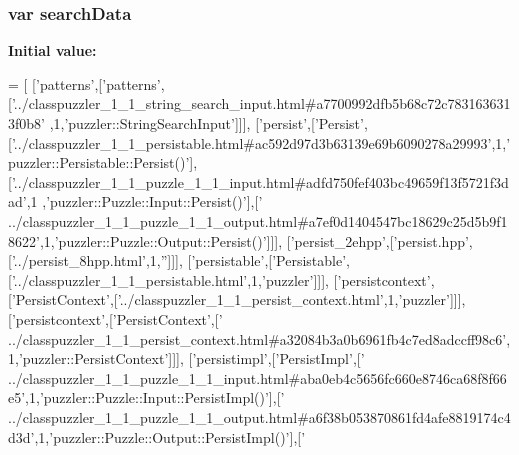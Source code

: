 \subsubsection[{search\+Data}]{\setlength{\rightskip}{0pt plus 5cm}var search\+Data}\label{a00058_ad01a7523f103d6242ef9b0451861231e}
{\bfseries Initial value\+:}
\begin{DoxyCode}
=
[
  [\textcolor{stringliteral}{'patterns'},[\textcolor{stringliteral}{'patterns'},[\textcolor{stringliteral}{'../classpuzzler\_1\_1\_string\_search\_input.html#a7700992dfb5b68c72c7831636313f0b8'}
      ,1,\textcolor{stringliteral}{'puzzler::StringSearchInput'}]]],
  [\textcolor{stringliteral}{'persist'},[\textcolor{stringliteral}{'Persist'},[\textcolor{stringliteral}{'../classpuzzler\_1\_1\_persistable.html#ac592d97d3b63139e69b6090278a29993'},1,\textcolor{stringliteral}{'
      puzzler::Persistable::Persist()'}],[\textcolor{stringliteral}{'../classpuzzler\_1\_1\_puzzle\_1\_1\_input.html#adfd750fef403bc49659f13f5721f3dad'},1
      ,\textcolor{stringliteral}{'puzzler::Puzzle::Input::Persist()'}],[\textcolor{stringliteral}{'
      ../classpuzzler\_1\_1\_puzzle\_1\_1\_output.html#a7ef0d1404547bc18629c25d5b9f18622'},1,\textcolor{stringliteral}{'puzzler::Puzzle::Output::Persist()'}]]],
  [\textcolor{stringliteral}{'persist\_2ehpp'},[\textcolor{stringliteral}{'persist.hpp'},[\textcolor{stringliteral}{'../persist\_8hpp.html'},1,\textcolor{stringliteral}{''}]]],
  [\textcolor{stringliteral}{'persistable'},[\textcolor{stringliteral}{'Persistable'},[\textcolor{stringliteral}{'../classpuzzler\_1\_1\_persistable.html'},1,\textcolor{stringliteral}{'puzzler'}]]],
  [\textcolor{stringliteral}{'persistcontext'},[\textcolor{stringliteral}{'PersistContext'},[\textcolor{stringliteral}{'../classpuzzler\_1\_1\_persist\_context.html'},1,\textcolor{stringliteral}{'puzzler'}]]],
  [\textcolor{stringliteral}{'persistcontext'},[\textcolor{stringliteral}{'PersistContext'},[\textcolor{stringliteral}{'
      ../classpuzzler\_1\_1\_persist\_context.html#a32084b3a0b6961fb4c7ed8adccff98c6'},1,\textcolor{stringliteral}{'puzzler::PersistContext'}]]],
  [\textcolor{stringliteral}{'persistimpl'},[\textcolor{stringliteral}{'PersistImpl'},[\textcolor{stringliteral}{'
      ../classpuzzler\_1\_1\_puzzle\_1\_1\_input.html#aba0eb4c5656fc660e8746ca68f8f66e5'},1,\textcolor{stringliteral}{'puzzler::Puzzle::Input::PersistImpl()'}],[\textcolor{stringliteral}{'
      ../classpuzzler\_1\_1\_puzzle\_1\_1\_output.html#a6f38b053870861fd4afe8819174c4d3d'},1,\textcolor{stringliteral}{'puzzler::Puzzle::Output::PersistImpl()'}],[\textcolor{stringliteral}{'
}
\end{DoxyCode}

